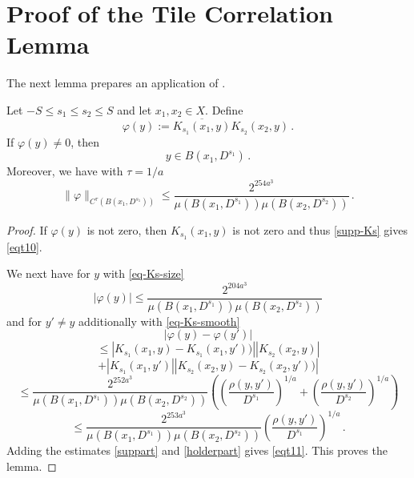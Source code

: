 \section{Proof of the Tile Correlation Lemma}\label{sec-tile-operator}

The next lemma prepares an application of
.
\begin{lemma}\label{correlation-kernel-bound}
\leanok
{}
Let $-S\le s_1\le s_2\le S$ and let $x_1,x_2\in X$.
Define \begin{equation}
 \varphi(y) := \overline{K_{s_1}(x_1, y)}
 K_{s_2}(x_2, y) \, .
\end{equation}
If $\varphi(y)\neq 0$, then
\begin{equation}\label{eqt10}
    y\in B(x_1, D^{s_1})\, .
\end{equation}
Moreover, we have with $\tau = 1/a$
\begin{equation}\label{eqt11}
  \|\varphi\|_{C^\tau(B(x_1, D^{s_1}))}\le
\frac{2^{254 a^3}}{\mu(B(x_1, D^{s_1}))\mu(B(x_2, D^{s_2}))}
      \, .
\end{equation}

\end{lemma}
\begin{proof}
\leanok

If $\varphi(y)$ is not zero, then $K_{s_1}(x_1, y)$ is not zero and thus
\eqref{supp-Ks} gives \eqref{eqt10}.

We next have for $y$ with \eqref{eq-Ks-size}
\begin{equation}\label{suppart}
    |\varphi(y)|\le
    \frac{2^{204 a^3}}{\mu(B(x_1, D^{s_1}))\mu(B(x_2, D^{s_2}))}
\end{equation}
and for $y'\neq y$ additionally with \eqref{eq-Ks-smooth}
\begin{equation}
    |\varphi(y)-\varphi(y')|
 \end{equation}
 \begin{equation}
 \le
 |K_{s_1}(x_1,y)-K_{s_1}(x_1,y'))||
 K_{s_2}(x_2, y)|
\end{equation}
 \begin{equation}+|K_{s_1}(x_1, y')|
 |K_{s_2}(x_2, y) - K_{s_2}(x_2, y'))|
\end{equation}
\begin{equation}
      \le \frac{2^{252 a^3}}{\mu(B(x_1, D^{s_1}))\mu(B(x_2, D^{s_2}))}
       \left(\left(\frac{ \rho(y,y')}{D^{s_1}}\right)^{1/a}+
       \left(\frac{ \rho(y,y')}{D^{s_2}}\right)^{1/a}\right)
\end{equation}
\begin{equation}\label{holderpart}
      \le \frac{2^{253 a^3}}{\mu(B(x_1, D^{s_1}))\mu(B(x_2, D^{s_2}))}
       \left(\frac{ \rho(y,y')}{D^{s_1}}\right)^{1/a}\,.
\end{equation}
Adding the estimates \eqref{suppart} and \eqref{holderpart} gives \eqref{eqt11}.
This proves the lemma.
\end{proof}

